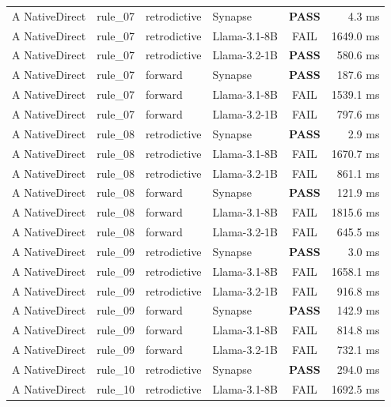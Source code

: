 {\begin{longtable}{p{2.2cm} p{1.2cm} p{2.0cm} p{3.8cm} c r}
A NativeDirect & rule\_07 & retrodictive & Synapse & \textbf{\color{passgreen}PASS} & 4.3 ms \\
A NativeDirect & rule\_07 & retrodictive & Llama-3.1-8B & \color{gray}FAIL & 1649.0 ms \\
A NativeDirect & rule\_07 & retrodictive & Llama-3.2-1B & \textbf{\color{passgreen}PASS} & 580.6 ms \\
A NativeDirect & rule\_07 & forward & Synapse & \textbf{\color{passgreen}PASS} & 187.6 ms \\
A NativeDirect & rule\_07 & forward & Llama-3.1-8B & \color{gray}FAIL & 1539.1 ms \\
A NativeDirect & rule\_07 & forward & Llama-3.2-1B & \color{gray}FAIL & 797.6 ms \\
A NativeDirect & rule\_08 & retrodictive & Synapse & \textbf{\color{passgreen}PASS} & 2.9 ms \\
A NativeDirect & rule\_08 & retrodictive & Llama-3.1-8B & \color{gray}FAIL & 1670.7 ms \\
A NativeDirect & rule\_08 & retrodictive & Llama-3.2-1B & \color{gray}FAIL & 861.1 ms \\
A NativeDirect & rule\_08 & forward & Synapse & \textbf{\color{passgreen}PASS} & 121.9 ms \\
A NativeDirect & rule\_08 & forward & Llama-3.1-8B & \color{gray}FAIL & 1815.6 ms \\
A NativeDirect & rule\_08 & forward & Llama-3.2-1B & \color{gray}FAIL & 645.5 ms \\
A NativeDirect & rule\_09 & retrodictive & Synapse & \textbf{\color{passgreen}PASS} & 3.0 ms \\
A NativeDirect & rule\_09 & retrodictive & Llama-3.1-8B & \color{gray}FAIL & 1658.1 ms \\
A NativeDirect & rule\_09 & retrodictive & Llama-3.2-1B & \color{gray}FAIL & 916.8 ms \\
A NativeDirect & rule\_09 & forward & Synapse & \textbf{\color{passgreen}PASS} & 142.9 ms \\
A NativeDirect & rule\_09 & forward & Llama-3.1-8B & \color{gray}FAIL & 814.8 ms \\
A NativeDirect & rule\_09 & forward & Llama-3.2-1B & \color{gray}FAIL & 732.1 ms \\
A NativeDirect & rule\_10 & retrodictive & Synapse & \textbf{\color{passgreen}PASS} & 294.0 ms \\
A NativeDirect & rule\_10 & retrodictive & Llama-3.1-8B & \color{gray}FAIL & 1692.5 ms \\

\end{longtable}}
